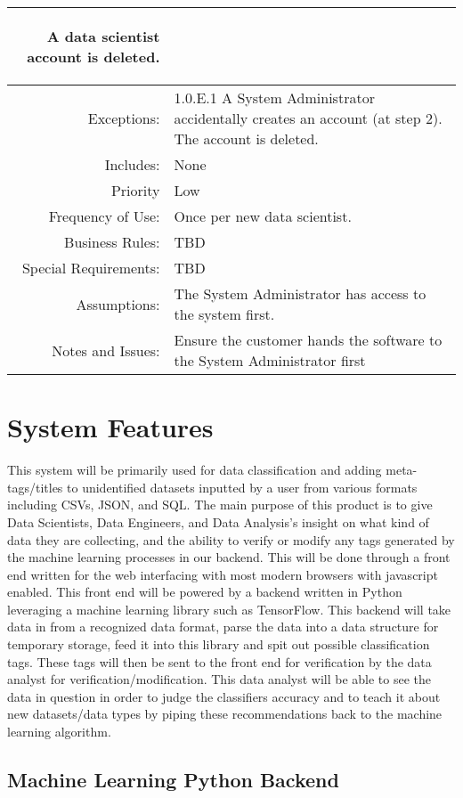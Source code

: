 \documentclass[12pt,oneside,letterpaper]{article}
\newenvironment{packed_enumerate}{ %
\vspace{-7mm}
\begin{enumerate}
  \setlength{\itemsep}{0pt}
  \setlength{\parskip}{0pt}
  \setlength{\parsep}{0pt}
}{\end{enumerate}
\vspace{-8mm}}
\begin{document}
\begin{longtable}{|r|p{3.8in}|}
\begin{packed_enumerate}
\item A data scientist account is deleted.
\end{packed_enumerate}\\
\hline
Exceptions:&1.0.E.1 A System Administrator accidentally creates an account (at step 2).\newline
The account is deleted.\\
\hline
Includes:&None\\
\hline
Priority&Low\\
\hline
Frequency of Use:&Once per new data scientist.\\
\hline
Business Rules:&TBD\\
\hline
Special Requirements:&TBD\\
\hline
Assumptions:&The System Administrator has access to the system first.\\
\hline
Notes and Issues:&Ensure the customer hands the software to the System Administrator first\\
\hline
\end{longtable}


\section{System Features}
This system will be primarily used for data classification and adding meta-tags/titles to unidentified datasets inputted by a user from various formats including CSVs, JSON, and SQL. The main purpose of this product is to give Data Scientists, Data Engineers, and Data Analysis's insight on what kind of data they are collecting, and the ability to verify or modify any tags generated by the machine learning processes in our backend. This will be done through a front end written for the web interfacing with most modern browsers with javascript enabled. This front end will be powered by a backend written in Python leveraging a machine learning library such as TensorFlow. This backend will take data in from a recognized data format, parse the data into a data structure for temporary storage, feed it into this library and spit out possible classification tags. These tags will then be sent to the front end for verification by the data analyst for verification/modification. This data analyst will be able to see the data in question in order to judge the classifiers accuracy and to teach it about new datasets/data types by piping these recommendations back to the machine learning algorithm.

  \subsection{Machine Learning Python Backend}
\end{document}
